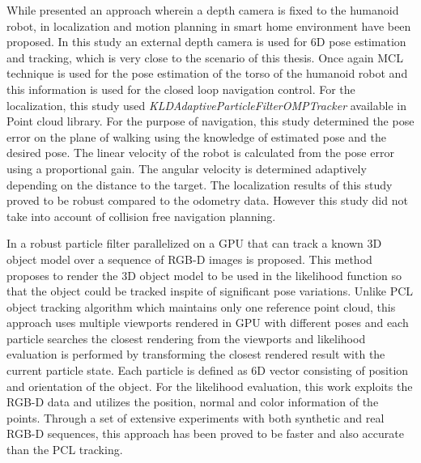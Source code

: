 {	While \cite{maier2012real} presented an approach wherein a depth camera is fixed to the humanoid robot, in \cite{cervera2012localization} localization and motion planning in smart home environment have been proposed. In this study an external depth camera is used for 6D pose estimation and tracking, which is very close to the scenario of this thesis. Once again MCL technique is used for the pose estimation of the torso of the humanoid robot and this information is used for the closed loop navigation control. For the localization, this study used  \emph{KLDAdaptiveParticleFilterOMPTracker} available in Point cloud library. For the purpose of navigation, this study determined the pose error on the plane of walking using the knowledge of estimated pose and the desired pose. The linear velocity of the robot is calculated from the pose error using a proportional gain. The angular velocity is determined adaptively depending on the distance to the target. The localization results of this study proved to be robust compared to the odometry data. However this study did not take into account of collision free navigation planning. 
	
	In \cite{choi2013rgb} a robust particle filter parallelized on a GPU that can track a known 3D object model over a sequence of RGB-D images is proposed. This method proposes to render the 3D object model to be used in the likelihood function so that the object could be tracked inspite of significant pose variations. Unlike PCL object tracking algorithm \cite{rusu20113d} which maintains only one reference point cloud, this approach uses multiple viewports rendered in GPU with different poses and each particle searches the closest rendering from the viewports and likelihood evaluation is performed by transforming the closest rendered result with the current particle state. Each particle is defined as 6D vector consisting of position and orientation of the object. For the likelihood evaluation, this work exploits the RGB-D data and utilizes the position, normal and color information of the points. Through a set of extensive experiments with both synthetic and real RGB-D sequences, this approach has been proved to be faster and also accurate than the PCL tracking.
	
}

